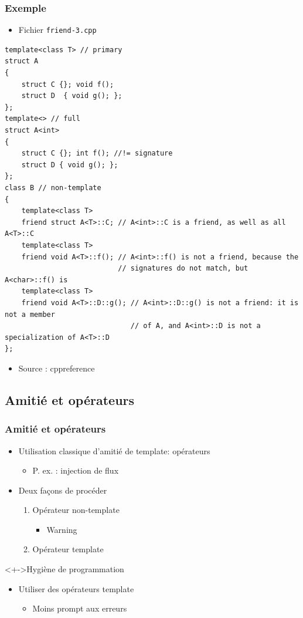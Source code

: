 \begin{frame}[containsverbatim]
\frametitle{Exemple}
\begin{itemize}
\item Fichier \texttt{friend-3.cpp}
\end{itemize}
\begin{lstlisting}
template<class T> // primary
struct A
{
    struct C {}; void f();
    struct D  { void g(); };
};
template<> // full
struct A<int>
{
    struct C {}; int f(); //!= signature
    struct D { void g(); };
};
class B // non-template
{
    template<class T>
    friend struct A<T>::C; // A<int>::C is a friend, as well as all A<T>::C
    template<class T>
    friend void A<T>::f(); // A<int>::f() is not a friend, because the
                           // signatures do not match, but A<char>::f() is
    template<class T>
    friend void A<T>::D::g(); // A<int>::D::g() is not a friend: it is not a member
                              // of A, and A<int>::D is not a specialization of A<T>::D
};
\end{lstlisting}
\begin{itemize}
\item Source : cppreference
\end{itemize}
\end{frame}

\subsection{Amitié et opérateurs}

\begin{frame}
\frametitle{Amitié et opérateurs}
\begin{itemize}[<+->]
\item Utilisation classique d'amitié de template: opérateurs
	\begin{itemize}
	\item P. ex. : injection de flux
	\end{itemize}
\item Deux façons de procéder
	\begin{enumerate}
	\item Opérateur non-template
		\begin{itemize}
		\item Warning
		\end{itemize}
	\item Opérateur template
	\end{enumerate}
\end{itemize}
\begin{block}<+->{Hygiène de programmation}
	\begin{itemize}[<+->]
	\item Utiliser des opérateurs template
		\begin{itemize}
		\item Moins prompt aux erreurs
		\end{itemize}
	\end{itemize}
\end{block}
\end{frame}

